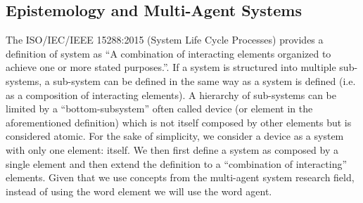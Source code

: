 \documentclass[conference]{IEEEtran}
\begin{document}
\subsection{Epistemology and Multi-Agent Systems}\label{sec:system}
The ISO/IEC/IEEE 15288:2015 (System Life Cycle Processes) provides a definition
of system as ``A combination of interacting elements organized to achieve one
or more stated purposes.''\autocite{ISO201515288}. If a system is structured
into multiple sub-systems, a sub-system can be defined in the same way as a
system is defined (i.e. as a composition of interacting elements). A hierarchy
of sub-systems can be limited by a ``bottom-subsystem'' often called device (or
element in the aforementioned definition) which is not itself composed by other
elements but is considered atomic.         For the sake of simplicity, we
consider a device as a system with only one element: itself.  We then first define a
system as composed by a single element and then extend the definition to a
``combination of interacting'' elements. Given that we use concepts from the
multi-agent system research field, instead of using the word element we will
use the word agent.
\end{document}
